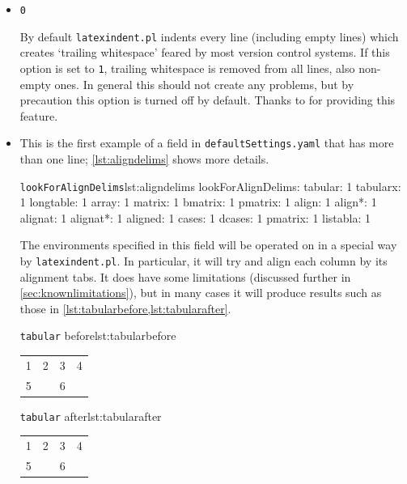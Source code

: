 \documentclass[11pt]{article}
\newcommand{\verbitem}[1]{\small\ttfamily{#1}}
\begin{document}
\begin{itemize}
	\item[\verbitem{removeTrailingWhitespace}] \lstinline!0!

		By default \lstinline!latexindent.pl! indents every line (including empty lines)
		which creates `trailing whitespace' feared by most version control systems. If
		this option is set to \lstinline!1!, trailing whitespace is removed from all
		lines, also non-empty ones. In general this should not create any problems, but
        by precaution this option is turned off by default. Thanks to \cite{vosskuhle} for
		providing this feature.

	\item[\verbitem{lookForAlignDelims}] This is the first example of a field
		in \lstinline!defaultSettings.yaml! that has more than one line; \cref{lst:aligndelims}
		shows more details.

		\begin{cmhlistings}[style=yaml]{\lstinline!lookForAlignDelims!}{lst:aligndelims}
lookForAlignDelims:
   tabular: 1
   tabularx: 1
   longtable: 1
   array: 1
   matrix: 1
   bmatrix: 1
   pmatrix: 1
   align: 1
   align*: 1
   alignat: 1
   alignat*: 1
   aligned: 1
   cases: 1
   dcases: 1
   pmatrix: 1
   listabla: 1
	\end{cmhlistings}

	The environments specified in this field will be operated on in a special way  by \lstinline!latexindent.pl!. In particular, it will try and align each column by its alignment
	tabs. It does have some limitations (discussed further in \cref{sec:knownlimitations}),
	but in many cases it will produce results such as those in \cref{lst:tabularbefore,lst:tabularafter}.

	\begin{minipage}{.5\textwidth}
		\begin{cmhlistings}[style=demo,columns=fixed]{\lstinline!tabular! before}{lst:tabularbefore}
\begin{tabular}{cccc}
1&	2 &3       &4\\
5& &6       &\\
\end{tabular}
		\end{cmhlistings}
	\end{minipage}
	\begin{minipage}{.5\textwidth}
		\begin{cmhlistings}[style=demo,columns=fixed]{\lstinline!tabular! after}{lst:tabularafter}
\begin{tabular}{cccc}
 1 & 2 & 3 & 4 \\
 5 &   & 6 &   \\
\end{tabular}
		\end{cmhlistings}
	\end{minipage}


\end{itemize}
\end{document}
